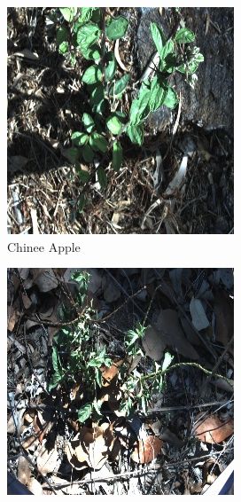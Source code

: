 \begin{figure}[h]
\centering
    \begin{subfigure}{0.24\textwidth}
        \includegraphics[width=\textwidth]{figuras/problema/chinee_apple.jpg}
        \caption{Chinee Apple}
    \end{subfigure}
    \hfill
    \begin{subfigure}{0.24\textwidth}
        \includegraphics[width=\textwidth]{figuras/problema/snake_weed.jpg}

\end{subfigure}
\end{figure}
